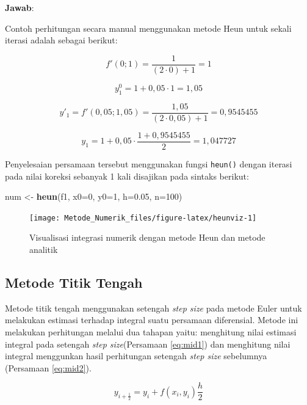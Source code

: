 \documentclass[
]{book}
\newenvironment{Shaded}{\begin{snugshade}}{\end{snugshade}}
\newcommand{\AttributeTok}[1]{\textcolor[rgb]{0.13,0.29,0.53}{#1}}
\newcommand{\DecValTok}[1]{\textcolor[rgb]{0.00,0.00,0.81}{#1}}
\newcommand{\FloatTok}[1]{\textcolor[rgb]{0.00,0.00,0.81}{#1}}
\newcommand{\FunctionTok}[1]{\textcolor[rgb]{0.13,0.29,0.53}{\textbf{#1}}}
\newcommand{\NormalTok}[1]{#1}
\newcommand{\OtherTok}[1]{\textcolor[rgb]{0.56,0.35,0.01}{#1}}
\theoremstyle{definition}
\theoremstyle{definition}
\theoremstyle{definition}
\theoremstyle{definition}
\theoremstyle{remark}
\begin{document}
\textbf{Jawab}:

Contoh perhitungan secara manual menggunakan metode Heun untuk sekali iterasi adalah sebagai berikut:

\[
f'\left(0;1\right)=\frac{1}{\left(2\cdot 0\right)+1}=1
\]

\[
y_{1}^0=1+0,05\cdot1=1,05
\]

\[
y'_1=f'\left(0,05;1,05\right)=\frac{1,05}{\left(2\cdot 0,05\right)+1}=0,9545455
\]

\[
y_1=1+0,05\cdot\frac{1+0,9545455}{2}=1,047727
\]

Penyelesaian persamaan tersebut menggunakan fungsi \texttt{heun()} dengan iterasi pada nilai koreksi sebanyak 1 kali disajikan pada sintaks berikut:

\begin{Shaded}
\begin{Highlighting}[]
\NormalTok{num }\OtherTok{\textless{}{-}} \FunctionTok{heun}\NormalTok{(f1, }\AttributeTok{x0=}\DecValTok{0}\NormalTok{, }\AttributeTok{y0=}\DecValTok{1}\NormalTok{, }\AttributeTok{h=}\FloatTok{0.05}\NormalTok{, }\AttributeTok{n=}\DecValTok{100}\NormalTok{)}
\end{Highlighting}
\end{Shaded}

\begin{figure}

{\centering \texttt{[image: Metode\_Numerik\_files/figure-latex/heunviz-1]} 

}

\caption{Visualisasi integrasi numerik dengan metode Heun dan metode analitik}\label{fig:heunviz}
\end{figure}

\hypertarget{midpt}{%
\subsection{Metode Titik Tengah}\label{midpt}}

Metode titik tengah menggunakan setengah \emph{step size} pada metode Euler untuk melakukan estimasi terhadap integral suatu persamaan diferensial. Metode ini melakukan perhitungan melalui dua tahapan yaitu: menghitung nilai estimasi integral pada setengah \emph{step size}(Persamaan \eqref{eq:mid1}) dan menghitung nilai integral menggunkan hasil perhitungan setengah \emph{step size} sebelumnya (Persamaan \eqref{eq:mid2}).

\begin{equation}
y_{i+\frac{1}{2}}=y_i+f\left(x_i,y_i\right)\frac{h}{2}
  \label{eq:mid1}
\end{equation}
\end{document}
